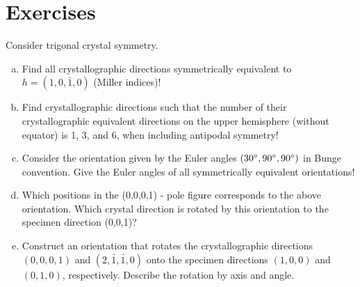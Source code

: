 \section{Exercises}

\begin{frame}

  \begin{Exercise}
    Consider trigonal crystal symmetry.

  \begin{enumerate}[a)]
    \item Find all crystallographic directions symmetrically equivalent to $h
      = (1, 0, \bar 1, 0)$ (Miller indices)!
    \item Find crystallographic directions such that the number of their
      crystallographic equivalent directions on the upper hemisphere (without
      equator) is 1, 3, and 6, when including antipodal symmetry!
    \item Consider the orientation given by the Euler angles $(30^\circ,
      90^\circ, 90^\circ)$ in Bunge convention. Give the Euler angles of
      all symmetrically equivalent orientations!
    \item Which positions in the (0,0,0,1) - pole figure corresponds to the
      above orientation. Which crystal direction is rotated by this
      orientation to the specimen direction (0,0,1)?
    \item Construct an orientation that rotates the crystallographic
      directions $(0,0,0,1)$ and $(2,\bar 1,\bar 1,0)$ onto the specimen
      directions $(1,0,0)$ and $(0,1,0)$, respectively. Describe the rotation
      by axis and angle.
    \end{enumerate}

  \end{Exercise}

\end{frame}

